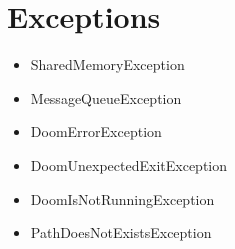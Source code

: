 \section{Exceptions}\label{sec:appendix_exception}
\begin{itemize}
    \item SharedMemoryException
    \item MessageQueueException
    \item DoomErrorException
    \item DoomUnexpectedExitException
    \item DoomIsNotRunningException
    \item PathDoesNotExistsException
\end{itemize}


